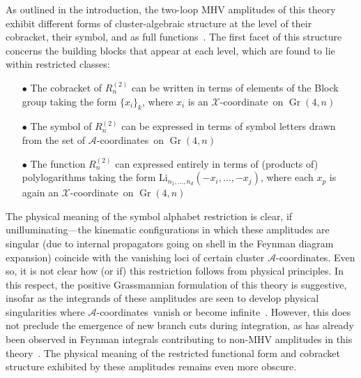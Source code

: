 \documentclass[12pt]{article}
\DeclareMathOperator{\Gr}{Gr}
\def\xcoord{$\mathcal{X}$-coordinate}
\def\acoords{$\mathcal{A}$-coordinates}
\begin{document}
As outlined in the introduction, the two-loop MHV amplitudes of this theory exhibit different forms of cluster-algebraic structure at the level of their cobracket, their symbol, and as full functions~\cite{Golden:2013xva,Golden:2014xqa,Golden:2014xqf,Golden:2014pua}. The first facet of this structure concerns the building blocks that appear at each level, which are found to lie within restricted classes:
\begin{itemize}
\item[$\bullet$] The cobracket of $R^{(2)}_n$ can be written in terms of elements of the Block group taking the form $\{x_i \}_k$, where $x_i$ is an \xcoord\ on $\Gr(4,n)$
\item[$\bullet$] The symbol of $R^{(2)}_n$ can be expressed in terms of symbol letters drawn from the set of \acoords\ on $\Gr(4,n)$
\item[$\bullet$] The function $R^{(2)}_n$ can expressed entirely in terms of (products of) polylogarithms taking the form $\text{Li}_{n_1,\dots,n_d}(-x_i,\dots,-x_j)$, where each $x_p$ is again an \xcoord\ on $\Gr(4,n)$
\end{itemize}
The physical meaning of the symbol alphabet restriction is clear, if unilluminating---the kinematic configurations in which these amplitudes are singular (due to internal propagators going on shell in the Feynman diagram expansion) coincide with the vanishing loci of certain cluster \acoords. Even so, it is not clear how (or if) this restriction follows from physical principles. In this respect, the positive Grassmannian formulation of this theory is suggestive, insofar as the integrands of these amplitudes are seen to develop physical singularities where \acoords\ vanish or become infinite~\cite{ArkaniHamed:2012nw}. However, this does not preclude the emergence of new branch cuts during integration, as has already been observed in Feynman integrals contributing to non-MHV amplitudes in this theory~\cite{Bourjaily:2018aeq,Henn:2018cdp}. The physical meaning of the restricted functional form and cobracket structure exhibited by these amplitudes remains even more obscure. 
\end{document}
